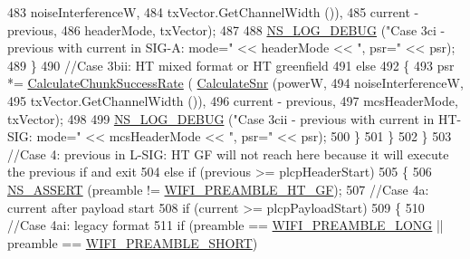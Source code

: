 \begin{DoxyCode}
483                                                                   noiseInterferenceW,
484                                                                   txVector.GetChannelWidth ()),
485                                                     current - previous,
486                                                     headerMode, txVector);
487 
488                   \hyperlink{group__logging_ga413f1886406d49f59a6a0a89b77b4d0a}{NS\_LOG\_DEBUG} (\textcolor{stringliteral}{"Case 3ci - previous with current in SIG-A: mode="} << 
      headerMode << \textcolor{stringliteral}{", psr="} << psr);
489                 \}
490               \textcolor{comment}{//Case 3bii: HT mixed format or HT greenfield}
491               \textcolor{keywordflow}{else}
492                 \{
493                   psr *= \hyperlink{classns3_1_1InterferenceHelper_ab1c34c3f7ecef1e37ec778c0cf0e9cef}{CalculateChunkSuccessRate} (
      \hyperlink{classns3_1_1InterferenceHelper_a8f6192d041874595004c007c5a519b4b}{CalculateSnr} (powerW,
494                                                                   noiseInterferenceW,
495                                                                   txVector.GetChannelWidth ()),
496                                                     current - previous,
497                                                     mcsHeaderMode, txVector);
498 
499                   \hyperlink{group__logging_ga413f1886406d49f59a6a0a89b77b4d0a}{NS\_LOG\_DEBUG} (\textcolor{stringliteral}{"Case 3cii - previous with current in HT-SIG: mode="} << 
      mcsHeaderMode << \textcolor{stringliteral}{", psr="} << psr);
500                 \}
501             \}
502         \}
503       \textcolor{comment}{//Case 4: previous in L-SIG: HT GF will not reach here because it will execute the previous if and
       exit}
504       \textcolor{keywordflow}{else} \textcolor{keywordflow}{if} (previous >= plcpHeaderStart)
505         \{
506           \hyperlink{assert_8h_a6dccdb0de9b252f60088ce281c49d052}{NS\_ASSERT} (preamble != \hyperlink{group__wifi_gga5e94a56cb338a14ffbbb19c6a41251eba82e0b00d79c1f01b7a6e46b693bafd72}{WIFI\_PREAMBLE\_HT\_GF});
507           \textcolor{comment}{//Case 4a: current after payload start}
508           \textcolor{keywordflow}{if} (current >= plcpPayloadStart)
509             \{
510               \textcolor{comment}{//Case 4ai: legacy format}
511               \textcolor{keywordflow}{if} (preamble == \hyperlink{group__wifi_gga5e94a56cb338a14ffbbb19c6a41251eba12f3d9468d1630bd38bbef20df1e3eda}{WIFI\_PREAMBLE\_LONG} || preamble == 
      \hyperlink{group__wifi_gga5e94a56cb338a14ffbbb19c6a41251ebab9a39ca1f62d36c33ac489c4cf59745b}{WIFI\_PREAMBLE\_SHORT})

\end{DoxyCode}
